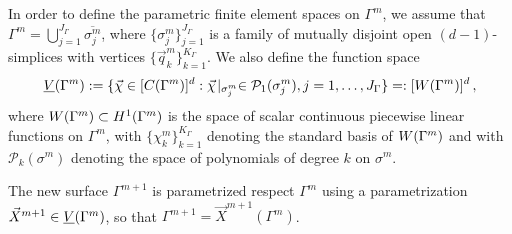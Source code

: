 In order to define the parametric finite element spaces on $\Gamma^m$, we
assume that $\Gamma^m=\bigcup_{j=1}^{J_\Gamma} \overline{\sigma^m_j}$, where
$\{\sigma^m_j\}_{j=1}^{J_\Gamma}$ is a family of mutually disjoint open
$(d-1)$-simplices with vertices $\{\vec{q}^m_k\}_{k=1}^{K_\Gamma}$. We also
define the function space
\begin{equation}
\underline{V}(\Gamma^m) := \{\vec\chi \in [C(\Gamma^m)]^d:\vec\chi\!\mid_{\sigma^m_j}
\in \mathcal{P}_1(\sigma^m_j), j=1,\ldots, J_\Gamma\} =: [W(\Gamma^m)]^d\,,
\end{equation}
where $W(\Gamma^m) \subset H^1(\Gamma^m)$ is the space of scalar continuous
piecewise linear functions on $\Gamma^m$, with $\{\chi^m_k\}_{k=1}^{K_\Gamma}$
denoting the standard basis of $W(\Gamma^m)$ and with $\mathcal{P}_k(\sigma^m)$
denoting the space of polynomials of degree $k$ on $\sigma^m$.

The new surface $\Gamma^{m+1}$ is parametrized respect $\Gamma^m$ using a
parametrization $\vec{X}^{m+1} \in \underline{V}(\Gamma^m)$, so that $\Gamma^{m+1} =
\vec{X}^{m+1}(\Gamma^m)$.

